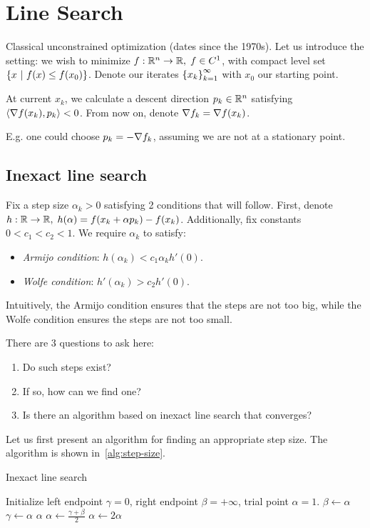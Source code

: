 \section{Line Search}
Classical unconstrained optimization (dates since the 1970s). Let us introduce
the setting: we wish to minimize $f: \mathbb{R}^n \to \mathbb{R}, \; f \in C^1$, with
compact level set $\left\{ x \ \middle| \  f(x) \leq f(x_0) \right\}$. Denote our iterates
$\left\{ x_k \right\}_{k=1}^{\infty}$ with $x_0$ our starting point.

At current $x_k$, we calculate a descent direction $p_k \in \mathbb{R}^n$ satisfying
$\left\langle \nabla f(x_k), p_k \right\rangle < 0$. From now on, denote $\nabla f_k = \nabla f(x_k)$.

E.g. one could choose $p_k = -\nabla f_k$, assuming we are not at a stationary
point.

\subsection{Inexact line search}
Fix a step size $\alpha_k > 0$ satisfying 2 conditions that will follow. First,
denote $h: \mathbb{R} \to \mathbb{R}, \; h(\alpha) = f(x_k + \alpha p_k) - f(x_k)$.
Additionally, fix constants $0 < c_1 < c_2 < 1$. We require $\alpha_k$ to
satisfy:
\begin{itemize}
	\item \textit{Armijo condition}: $h(\alpha_k) < c_1 \alpha_k h'(0)$.
	\item \textit{Wolfe condition}: $h'(\alpha_k) > c_2 h'(0)$.
\end{itemize}
Intuitively, the Armijo condition ensures that the steps are not too big, while
the Wolfe condition ensures the steps are not too small.

There are $3$ questions to ask here:
\begin{enumerate}
	\item Do such steps exist?
	\item If so, how can we find one?
	\item Is there an algorithm based on inexact line search that converges?
\end{enumerate}

Let us first present an algorithm for finding an appropriate step size. The
algorithm is shown in~\cref{alg:step-size}.
\begin{algorithm}
	\caption{Inexact line search}
	\begin{algorithmic}
		\State Initialize left endpoint $\gamma = 0$, right endpoint $\beta =
		+\infty$, trial point $\alpha = 1$.
		\Repeat
				\State $\beta \gets \alpha$
			\Else
					\State $ \gamma \gets \alpha $
				\Else
					\State \Return $\alpha$ 
				\EndIf
			\EndIf
			\If{$\beta < +\infty$}
				\State $\alpha \gets \frac{\gamma + \beta}{2}$
			\Else
				\State $\alpha \gets 2 \alpha$
			\EndIf
	\end{algorithmic}
	\label{alg:step-size}
\end{algorithm}

